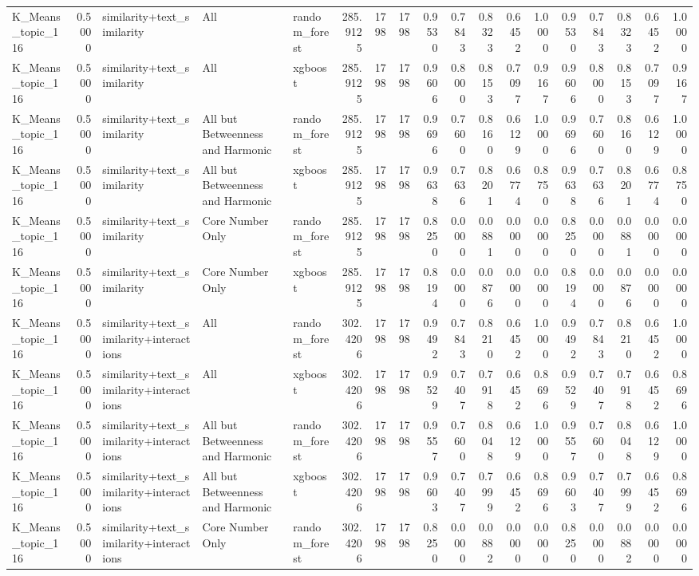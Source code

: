 \begin{tabular}{lrlllrrrrrrrrrrrrr}
K_Means_topic_116 & 0.5000 & similarity+text_similarity & All & random_forest & 285.9125 & 1798 & 1798 & 0.9530 & 0.7843 & 0.8323 & 0.6452 & 1.0000 & 0.9530 & 0.7843 & 0.8323 & 0.6452 & 1.0000 \\
K_Means_topic_116 & 0.5000 & similarity+text_similarity & All & xgboost & 285.9125 & 1798 & 1798 & 0.9606 & 0.8000 & 0.8153 & 0.7097 & 0.9167 & 0.9606 & 0.8000 & 0.8153 & 0.7097 & 0.9167 \\
K_Means_topic_116 & 0.5000 & similarity+text_similarity & All but Betweenness and Harmonic & random_forest & 285.9125 & 1798 & 1798 & 0.9696 & 0.7600 & 0.8160 & 0.6129 & 1.0000 & 0.9696 & 0.7600 & 0.8160 & 0.6129 & 1.0000 \\
K_Means_topic_116 & 0.5000 & similarity+text_similarity & All but Betweenness and Harmonic & xgboost & 285.9125 & 1798 & 1798 & 0.9638 & 0.7636 & 0.8201 & 0.6774 & 0.8750 & 0.9638 & 0.7636 & 0.8201 & 0.6774 & 0.8750 \\
K_Means_topic_116 & 0.5000 & similarity+text_similarity & Core Number Only & random_forest & 285.9125 & 1798 & 1798 & 0.8250 & 0.0000 & 0.0881 & 0.0000 & 0.0000 & 0.8250 & 0.0000 & 0.0881 & 0.0000 & 0.0000 \\
K_Means_topic_116 & 0.5000 & similarity+text_similarity & Core Number Only & xgboost & 285.9125 & 1798 & 1798 & 0.8194 & 0.0000 & 0.0876 & 0.0000 & 0.0000 & 0.8194 & 0.0000 & 0.0876 & 0.0000 & 0.0000 \\
K_Means_topic_116 & 0.5000 & similarity+text_similarity+interactions & All & random_forest & 302.4206 & 1798 & 1798 & 0.9492 & 0.7843 & 0.8210 & 0.6452 & 1.0000 & 0.9492 & 0.7843 & 0.8210 & 0.6452 & 1.0000 \\
K_Means_topic_116 & 0.5000 & similarity+text_similarity+interactions & All & xgboost & 302.4206 & 1798 & 1798 & 0.9529 & 0.7407 & 0.7918 & 0.6452 & 0.8696 & 0.9529 & 0.7407 & 0.7918 & 0.6452 & 0.8696 \\
K_Means_topic_116 & 0.5000 & similarity+text_similarity+interactions & All but Betweenness and Harmonic & random_forest & 302.4206 & 1798 & 1798 & 0.9557 & 0.7600 & 0.8048 & 0.6129 & 1.0000 & 0.9557 & 0.7600 & 0.8048 & 0.6129 & 1.0000 \\
K_Means_topic_116 & 0.5000 & similarity+text_similarity+interactions & All but Betweenness and Harmonic & xgboost & 302.4206 & 1798 & 1798 & 0.9603 & 0.7407 & 0.7999 & 0.6452 & 0.8696 & 0.9603 & 0.7407 & 0.7999 & 0.6452 & 0.8696 \\
K_Means_topic_116 & 0.5000 & similarity+text_similarity+interactions & Core Number Only & random_forest & 302.4206 & 1798 & 1798 & 0.8250 & 0.0000 & 0.0882 & 0.0000 & 0.0000 & 0.8250 & 0.0000 & 0.0882 & 0.0000 & 0.0000 \\

\end{tabular}
